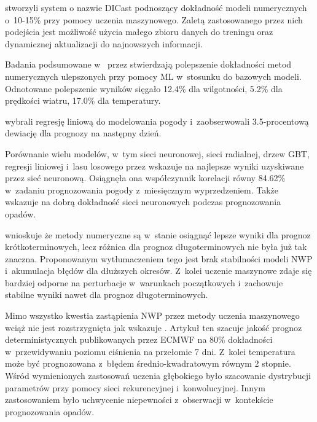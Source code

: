 \cite{machine-learning-for-applied-weather-prediction} stworzyli system 
o nazwie DICast podnoszący dokładność modeli numerycznych o~10-15\% przy pomocy
uczenia maszynowego. Zaletą zastosowanego przez nich podejścia jest możliwość
użycia małego zbioru danych do treningu oraz dynamicznej aktualizacji do 
najnowszych informacji.

Badania podsumowane w~ przez  
\cite{ai-revolutionises-weather-prediction}
stwierdzają polepszenie dokładności metod numerycznych ulepszonych przy
pomocy ML w~stosunku do bazowych modeli. Odnotowane polepszenie wyników
sięgało 12.4\% dla wilgotności, 5.2\% dla prędkości wiatru, 17.0\% dla
temperatury.

\cite{weather-monitoring-using-artificial-intelligence}
wybrali regresję liniową do modelowania pogody i~zaobserwowali 3.5-procentową
dewiację dla prognozy na następny dzień.

Porównanie wielu modelów, w~tym sieci neuronowej, sieci radialnej, 
drzew GBT, regresji liniowej i~lasu losowego przez 
\cite{developing-machine-learning-algorithms} wskazuje na 
najlepsze wyniki uzyskiwane przez sieć neuronową. Osiągnęła ona 
współczynnik korelacji równy 84.62\% w~zadaniu prognozowania
pogody z~miesięcznym wyprzedzeniem. Także  
\cite{weather-forecasting-using-dl} wskazuje na dobrą dokładność
sieci neuronowych podczas prognozowania opadów.

\cite{ml-applied-to-weather-forecasting} wnioskuje że metody 
numeryczne są w~stanie osiągnąć lepsze wyniki dla prognoz 
krótkoterminowych, lecz różnica dla prognoz długoterminowych
nie była już tak znaczna. Proponowanym wytłumaczeniem tego jest
brak stabilności modeli NWP i~akumulacja błędów dla dłuższych 
okresów. Z~kolei uczenie maszynowe zdaje się bardziej
odporne na perturbacje w~warunkach początkowych i~zachowuje 
stabilne wyniki nawet dla prognoz długoterminowych.

Mimo wszystko kwestia zastąpienia NWP przez metody uczenia maszynowego
wciąż nie jest rozstrzygnięta jak wskazuje 
\cite{can-dl-beat-numerical}. Artykuł ten szacuje jakość prognoz 
deterministycznych publikowanych przez ECMWF na 80\% dokładności w~przewidywaniu
poziomu ciśnienia na przełomie 7 dni. Z~kolei temperatura może być 
prognozowana z~błędem średnio-kwadratowym równym 2 stopnie. Wśród wymienionych
zastosowań uczenia głębokiego było szacowanie dystrybucji parametrów przy pomocy 
sieci rekurencyjnej i~konwolucyjnej. Innym zastosowaniem było uchwycenie
niepewności z~obserwacji w~kontekście prognozowania opadów.

